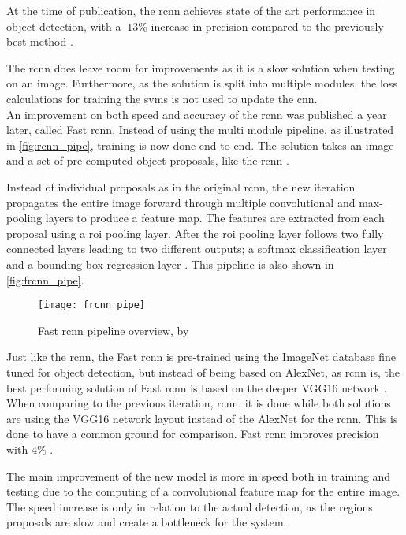 At the time of publication, the \gls{rcnn} achieves state of the art performance in object detection, with a $~13\%$ increase in precision compared to the previously best method \citep{Girshick2014}.

The \gls{rcnn} does leave room for improvements as it is a slow solution when testing on an image. Furthermore, as the solution is split into multiple modules, the loss calculations for training the \gls{svm}s is not used to update the \gls{cnn}.\\

An improvement on both speed and accuracy of the \gls{rcnn} was published a year later, called Fast \gls{rcnn}. Instead of using the multi module pipeline, as illustrated in \autoref{fig:rcnn_pipe}, training is now done end-to-end. The solution takes an image  and a set of pre-computed object proposals, like the \gls{rcnn} \citep{Girshick2015}.

Instead of individual proposals as in the original \gls{rcnn}, the new iteration propagates the entire image forward through multiple convolutional and max-pooling layers to produce a feature map. The features are extracted from each proposal using a \gls{roi} pooling layer. After the \gls{roi} pooling layer follows two fully connected layers leading to two different outputs; a softmax classification layer and a bounding box regression layer \citep{Girshick2015}. This pipeline is also shown in \autoref{fig:frcnn_pipe}.

\begin{figure}[H]
	\centering
	\texttt{[image: frcnn\_pipe]}
	\caption{Fast \gls{rcnn} pipeline overview, by \cite{Girshick2015}}
	\label{fig:frcnn_pipe}
\end{figure}

Just like the \gls{rcnn}, the Fast \gls{rcnn} is pre-trained using the ImageNet database fine tuned for object detection, but instead of being based on AlexNet, as \gls{rcnn} is, the best performing solution of Fast \gls{rcnn} is based on the deeper VGG16 network \citep{Girshick2015}. When comparing to the previous iteration, \gls{rcnn}, it is done while both solutions are using the VGG16 network layout instead of the AlexNet for the \gls{rcnn}. This is done to have a common ground for comparison. Fast \gls{rcnn} improves precision with $4\%$ \citep{Girshick2015}.

The main improvement of the new model is more in speed both in training and testing due to the computing of a convolutional feature map for the entire image. The speed increase is only in relation to the actual detection, as the regions proposals are slow and create a bottleneck for the system \citep{Girshick2015}.\\

